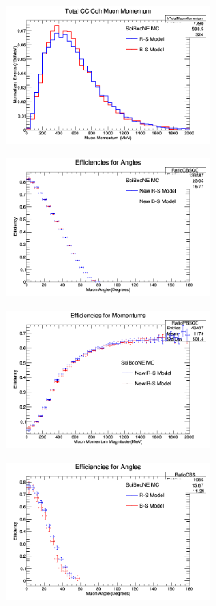 \documentclass[11pt]{article}
\begin{document}
\begin{figure}[H]
\centering
\includegraphics[width=0.6\textwidth]{ANMCombinedPlotsImages/14-ANMCombinedPlots.png}
\caption{}
\end{figure}

\begin{figure}[H]
\centering
\includegraphics[width=0.6\textwidth]{ANMCombinedPlotsImages/15-ANMCombinedPlots.png}
\caption{}
\end{figure}

\begin{figure}[H]
\centering
\includegraphics[width=0.6\textwidth]{ANMCombinedPlotsImages/16-ANMCombinedPlots.png}
\caption{}
\end{figure}

\begin{figure}[H]
\centering
\includegraphics[width=0.6\textwidth]{ANMCombinedPlotsImages/17-ANMCombinedPlots.png}
\caption{}
\end{figure}
\end{document}
